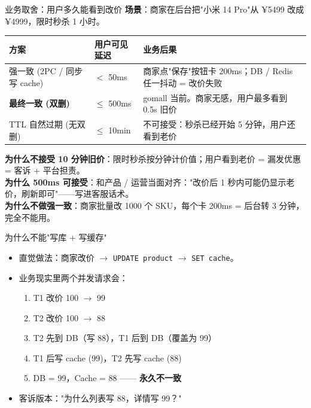 \documentclass[aspectratio=169,11pt]{beamer}
\begin{document}
\begin{frame}[shrink]{业务取舍：用户多久能看到改价}
\footnotesize
\textbf{场景}：商家在后台把"小米 14 Pro"从 ¥5499 改成 ¥4999，限时秒杀 1 小时。
\vspace{1mm}
\begin{center}
\begin{tabular}{@{}llp{5.8cm}@{}}
\toprule
方案 & 用户可见延迟 & 业务后果 \\
\midrule
强一致 (2PC / 同步写 cache) & $<$ 50ms       & 商家点"保存"按钮卡 200ms；DB / Redis 任一抖动 = 改价失败 \\
\textbf{最终一致 (双删)}    & $\le$ 500ms    & gomall 当前。商家无感，用户最多看到 0.5s 旧价 \\
TTL 自然过期 (无双删)       & $\le$ 10min    & 不可接受：秒杀已经开始 5 分钟，用户还看到老价 \\
\bottomrule
\end{tabular}
\end{center}
\vspace{2mm}

\textbf{为什么不接受 10 分钟旧价}：限时秒杀按分钟计价值；用户看到老价 = 漏发优惠 = 客诉 + 平台担责。\\
\textbf{为什么 500ms 可接受}：和产品 / 运营当面对齐："改价后 1 秒内可能仍显示老价，刷新即可"——写进客服话术。\\
\textbf{为什么不做强一致}：商家批量改 1000 个 SKU，每个卡 200ms = 后台转 3 分钟，完全不能用。
\end{frame}

\begin{frame}[shrink]{为什么不能"写库 + 写缓存"}
\begin{itemize}
  \item 直觉做法：商家改价 $\to$ \texttt{UPDATE product} $\to$ \texttt{SET cache}。
  \item 业务现实里两个并发请求会：
  \begin{enumerate}
    \item T1 改价 100 $\to$ 99
    \item T2 改价 100 $\to$ 88
    \item T2 先到 DB（写 88），T1 后到 DB（覆盖为 99）
    \item T1 后写 cache (99)，T2 先写 cache (88)
    \item DB = 99，Cache = 88 —— \textbf{永久不一致}
  \end{enumerate}
  \item 客诉版本："为什么列表写 88，详情写 99？"
\end{itemize}
\end{frame}
\end{document}
